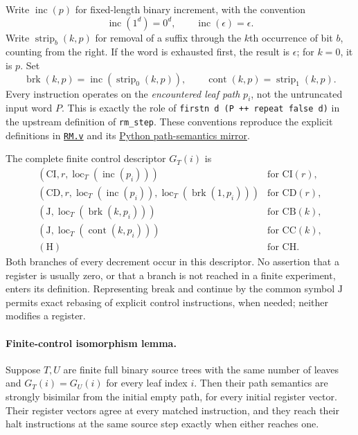 Write $\operatorname{inc}(p)$ for fixed-length binary increment, with the
convention
\[
 \operatorname{inc}(1^d)=0^d,
 \qquad \operatorname{inc}(\epsilon)=\epsilon.
\]
Write $\operatorname{strip}_b(k,p)$ for removal of a suffix through the
$k$th occurrence of bit $b$, counting from the right.  If the word is
exhausted first, the result is $\epsilon$; for $k=0$, it is $p$.  Set
\[
 \operatorname{brk}(k,p)=
 \operatorname{inc}(\operatorname{strip}_0(k,p)),
 \qquad
 \operatorname{cont}(k,p)=\operatorname{strip}_1(k,p).
\]
Every instruction operates on the \emph{encountered leaf path} $p_i$,
not the untruncated input word $P$.  This is exactly the role of
\texttt{firstn d (P ++ repeat false d)} in the upstream definition of
\texttt{rm\_step}.  These conventions reproduce the explicit definitions
in \href{https://github.com/jeff87654/busy-beaver/blob/zf-254/ZF/m254/coq/tm/RM.v}
{\texttt{RM.v}} and its
\href{https://github.com/jeff87654/busy-beaver/blob/zf-254/ZF/m254/tools/prog/rmpath.py}
{Python path-semantics mirror}.

The complete finite control descriptor $G_T(i)$ is
\[
\begin{array}{ll}
 (\mathrm{CI},r,\operatorname{loc}_T(\operatorname{inc}(p_i)))
       &\text{for }\mathrm{CI}(r),\\
 (\mathrm{CD},r,\operatorname{loc}_T(\operatorname{inc}(p_i)),
             \operatorname{loc}_T(\operatorname{brk}(1,p_i)))
       &\text{for }\mathrm{CD}(r),\\
 (\mathrm{J},\operatorname{loc}_T(\operatorname{brk}(k,p_i)))
       &\text{for }\mathrm{CB}(k),\\
 (\mathrm{J},\operatorname{loc}_T(\operatorname{cont}(k,p_i)))
       &\text{for }\mathrm{CC}(k),\\
 (\mathrm{H})&\text{for }\mathrm{CH}.
\end{array}
\]
Both branches of every decrement occur in this descriptor.  No assertion
that a register is usually zero, or that a branch is not reached in a
finite experiment, enters its definition.  Representing break and continue
by the common symbol $\mathrm J$ permits exact rebasing of explicit control
instructions, when needed; neither modifies a register.

\paragraph{Finite-control isomorphism lemma.}
Suppose $T,U$ are finite full binary source trees with the same number of
leaves and $G_T(i)=G_U(i)$ for every leaf index $i$.  Then their path
semantics are strongly bisimilar from the initial empty path, for every
initial register vector.  Their register vectors agree at every matched
instruction, and they reach their halt instructions at the same source
step exactly when either reaches one.

